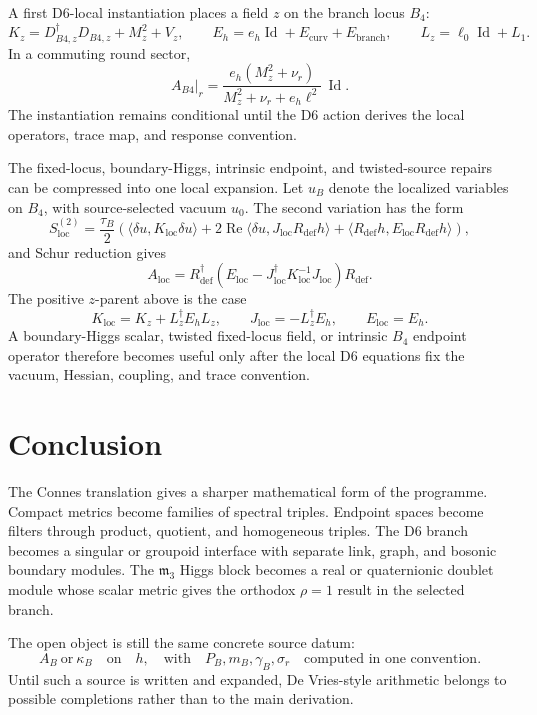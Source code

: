 \documentclass[11pt]{article}
\newcommand{\Id}{\operatorname{Id}}
\newcommand{\mthree}{\mathfrak m_3}
\begin{document}
A first D6-local instantiation places a field \(z\) on the branch locus
\(B_4\):
\[
  K_z=D_{B4,z}^{\dagger}D_{B4,z}+M_z^2+V_z,\qquad
  E_h=e_h\Id+E_{\mathrm{curv}}+E_{\mathrm{branch}},\qquad
  L_z=\ell_0\Id+L_1.
\]
In a commuting round sector,
\[
  A_{B4}\vert_r
  =\frac{e_h(M_z^2+\nu_r)}{M_z^2+\nu_r+e_h\ell^2}\,\Id .
\]
The instantiation remains conditional until the D6 action derives the local
operators, trace map, and response convention.

The fixed-locus, boundary-Higgs, intrinsic endpoint, and twisted-source
repairs can be compressed into one local expansion.  Let \(u_B\) denote the
localized variables on \(B_4\), with source-selected vacuum \(u_0\).  The
second variation has the form
\[
S_{\mathrm{loc}}^{(2)}
 =\frac{\tau_B}{2}\left(
   \langle \delta u,K_{\mathrm{loc}}\delta u\rangle
   +2\operatorname{Re}\langle \delta u,
       J_{\mathrm{loc}}R_{\mathrm{def}}h\rangle
   +\langle R_{\mathrm{def}}h,
       E_{\mathrm{loc}}R_{\mathrm{def}}h\rangle
 \right),
\]
and Schur reduction gives
\[
  A_{\mathrm{loc}}
  =R_{\mathrm{def}}^\dagger
    \left(E_{\mathrm{loc}}
      -J_{\mathrm{loc}}^\dagger K_{\mathrm{loc}}^{-1}J_{\mathrm{loc}}
    \right)R_{\mathrm{def}}.
\]
The positive \(z\)-parent above is the case
\[
K_{\mathrm{loc}}=K_z+L_z^\dagger E_hL_z,\qquad
J_{\mathrm{loc}}=-L_z^\dagger E_h,\qquad
E_{\mathrm{loc}}=E_h.
\]
A boundary-Higgs scalar, twisted fixed-locus field, or intrinsic \(B_4\)
endpoint operator therefore becomes useful only after the local D6 equations
fix the vacuum, Hessian, coupling, and trace convention.

\section{Conclusion}

The Connes translation gives a sharper mathematical form of the programme.
Compact metrics become families of spectral triples.  Endpoint spaces become
filters through product, quotient, and homogeneous triples.  The D6 branch
becomes a singular or groupoid interface with separate link, graph, and
bosonic boundary modules.  The \(\mthree\) Higgs block becomes a real or
quaternionic doublet module whose scalar metric gives the orthodox
\(\rho=1\) result in the selected branch.

The open object is still the same concrete source datum:
\[
  A_B\ \text{or}\ \kappa_B
  \quad\text{on}\quad h,
  \quad\text{with}\quad P_B,m_B,\gamma_B,\sigma_r
  \quad\text{computed in one convention}.
\]
Until such a source is written and expanded, De Vries-style arithmetic
belongs to possible completions rather than to the main derivation.
\end{document}
